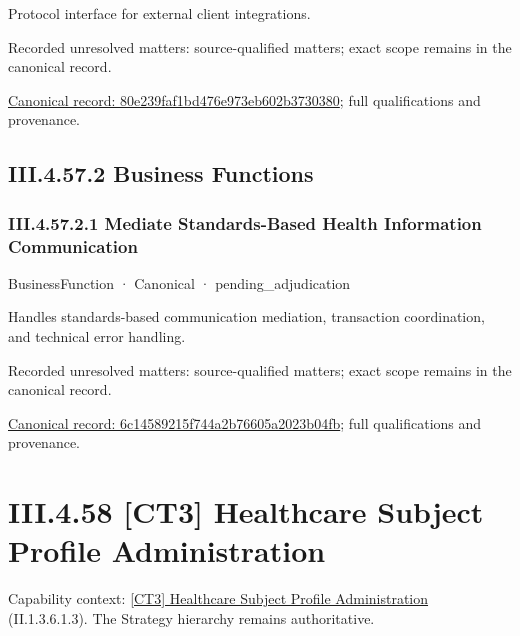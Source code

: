 Protocol interface for external client integrations.


{\small Recorded unresolved matters: source-qualified matters; exact scope remains in the canonical record.}\par
{\footnotesize \href{../../../../continuum/business/business-service/80e239faf1bd476e973eb602b3730380.md}{Canonical record: 80e239faf1bd476e973eb602b3730380}; full qualifications and provenance.}\par
\subsection*{III.4.57.2 Business Functions}
\label{navigation:III.4.57.2}

\subsubsection*{III.4.57.2.1 Mediate Standards-Based Health Information Communication}
\label{navigation:III.4.57.2.1}

\label{element:6c14589215f744a2b76605a2023b04fb}
{\small BusinessFunction · Canonical · pending\_adjudication}\par

Handles standards-based communication mediation, transaction coordination, and technical error handling.


{\small Recorded unresolved matters: source-qualified matters; exact scope remains in the canonical record.}\par
{\footnotesize \href{../../../../continuum/business/business-function/6c14589215f744a2b76605a2023b04fb.md}{Canonical record: 6c14589215f744a2b76605a2023b04fb}; full qualifications and provenance.}\par
\section*{III.4.58 [CT3] Healthcare Subject Profile Administration}
\label{navigation:III.4.58}

{\small Capability context: \hyperref[element:df214b5499694b768eb4a7a175a9d471]{[CT3] Healthcare Subject Profile Administration} (II.1.3.6.1.3). The Strategy hierarchy remains authoritative.}\par
